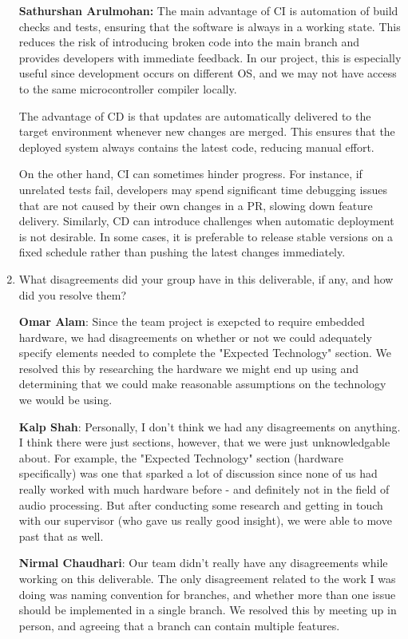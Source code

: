 \documentclass{article}
\begin{document}
\begin{enumerate}
    \textbf{Sathurshan Arulmohan:} The main advantage of CI is automation of build checks and tests, ensuring that the software is always in a working state.
    This reduces the risk of introducing broken code into the main branch and provides developers with immediate feedback.
    In our project, this is especially useful since development occurs on different OS, and we may not have access to the same microcontroller compiler locally.

    The advantage of CD is that updates are automatically delivered to the target environment whenever new changes are merged.
    This ensures that the deployed system always contains the latest code, reducing manual effort.
    
    On the other hand, CI can sometimes hinder progress.
    For instance, if unrelated tests fail, developers may spend significant time debugging issues that are not caused by their own changes in a PR, slowing down feature delivery.
    Similarly, CD can introduce challenges when automatic deployment is not desirable.
    In some cases, it is preferable to release stable versions on a fixed schedule rather than pushing the latest changes immediately.

    \item What disagreements did your group have in this deliverable, if any,
    and how did you resolve them?

    \textbf{Omar Alam}: Since the team project is exepcted to require embedded hardware, we had disagreements on whether or not we could adequately
    specify elements needed to complete the "Expected Technology" section. We resolved this by researching the hardware we might end up using and 
    determining that we could make reasonable assumptions on the technology we would be using.

    \textbf{Kalp Shah}: Personally, I don't think we had any disagreements on anything. I think there were just sections, however, that we were just
    unknowledgable about. For example, the "Expected Technology" section (hardware specifically) was one that sparked a lot of discussion since none
    of us had really worked with much hardware before - and definitely not in the field of audio processing. But after conducting some research
    and getting in touch with our supervisor (who gave us really good insight), we were able to move past that as well. 
    
    \textbf{Nirmal Chaudhari}: Our team didn't really have any disagreements while working on this deliverable. 
    The only disagreement related to the work I was doing was naming convention for branches, and whether more than one issue should be implemented in a single branch. 
    We resolved this by meeting up in person, and agreeing that a branch can contain multiple features. 


\end{enumerate}
\end{document}
